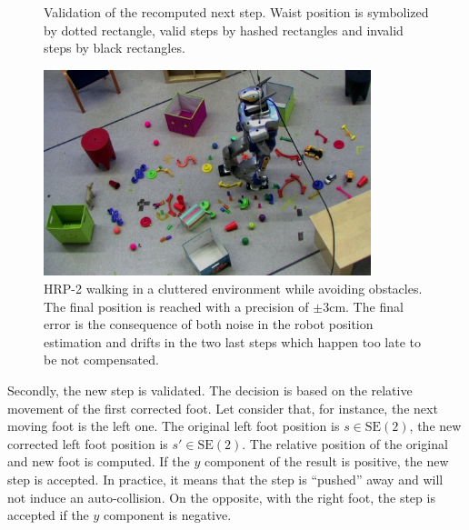 \begin{figure}[ht!]
\begin{center}
  \end{center}
  \caption{Validation of the recomputed next step. Waist position is
    symbolized by dotted rectangle, valid steps by hashed rectangles
    and invalid steps by black rectangles.
    \label{fig:stepvalid}}
\end{figure}


\begin{figure}[!t]
  \begin{center}
    \includegraphics[width=0.85\textwidth]{fig/demo.jpg}
  \end{center}
  \caption{HRP-2 walking in a cluttered environment while avoiding
    obstacles. The final position is reached with a precision of $\pm
    3\mathrm{cm}$. The final error is the consequence of both noise in
    the robot position estimation and drifts in the two last steps
    which happen too late to be not compensated. \label{fig:scenario}}
\end{figure}



Secondly, the new step is validated. The decision is based on the
relative movement of the first corrected foot. Let consider that, for
instance, the next moving foot is the left one. The original left foot
position is \mbox{$s \in \text{SE}(2)$}, the new corrected left foot
position is \mbox{$s' \in \text{SE}(2)$}. The relative position of the
original and new foot is computed. If the $y$ component of the result
is positive, the new step is accepted. In practice, it means that the
step is ``pushed'' away and will not induce an auto-collision. On the
opposite, with the right foot, the step is accepted if the $y$
component is negative.


